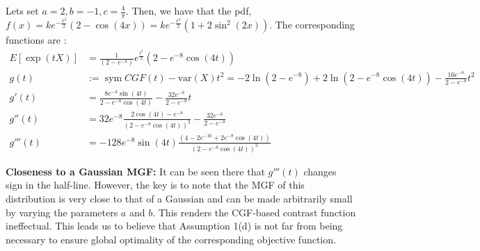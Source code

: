 \documentclass[letterpaper]{article}
\newcommand{\var}{\text{var}}
\DeclareMathOperator{\sym}{sym}
\begin{document}
Lets set $a = 2, b = -1, c = \frac{4}{\pi}$. Then, we have that the pdf, $f(x) = ke^{-\frac{x^{2}}{2}}(2 - \cos(4x)) = ke^{-\frac{x^{2}}{2}}(1 + 2\sin^{2}(2x))$. The corresponding functions are : 
\begin{align*}
    E[\exp(t X)] &= \frac{1}{(2 - e^{-8})}e^{\frac{t^{2}}{2}}\left(2 - e^{-8}\cos(4t)\right)\\
    g(t) &:=\sym CGF(t)-\var(X)t^2=  -2\ln(2 - e^{-8}) + 2\ln(2 - e^{-8}\cos(4t)) - \frac{16e^{-8}}{2 - e^{-8}}t^2\label{eq:contrastcos}\\
    g'(t) &= \frac{8 e^{-8} \sin(4t)}{2 - e^{-8}\cos(4t)} - \frac{32e^{-8}}{2 - e^{-8}}t\\
    g''(t) &= 32 e^{-8}\frac{2 \cos(4 t) -  e^{-8}}{(2 - e^{-8}\cos(4t))^{2}} - \frac{32e^{-8}}{2 - e^{-8}}\\
    g'''(t) &= -128 e^{-8}\sin(4t)\frac{\left(4 - 2e^{-16} + 2 e^{-8}\cos(4t)\right) }{(2 - e^{-8}\cos(4t))^{3}}
\end{align*}

 \textbf{Closeness to a Gaussian MGF:}
It can be seen there that $g'''(t)$ changes sign in the half-line. However, the key is to note that the MGF of this distribution is very close to that of a Gaussian and can be made arbitrarily small by varying the parameters $a$ and $b$. This renders the CGF-based contrast function ineffectual. This leads us to believe that Assumption 1(d) is not far from being necessary to ensure global optimality of the corresponding objective function.

\end{document}
